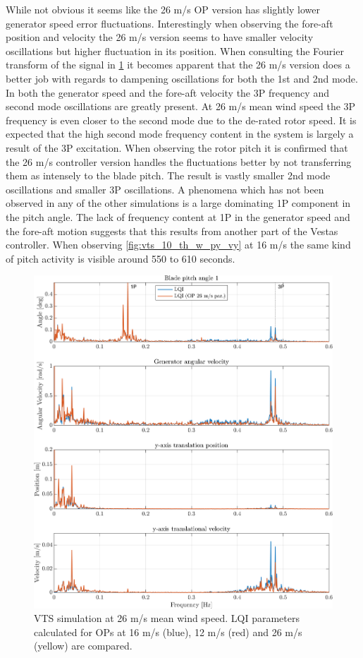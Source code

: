 While not obvious it seems like the 26 m/s OP version has slightly lower generator speed error fluctuations. Interestingly when observing the fore-aft position and velocity the 26 m/s version seems to have smaller velocity oscillations but higher fluctuation in its position. When consulting the Fourier transform of the signal in \cref{fig:vts_31_fft_th_w_py_vy} it becomes apparent that the 26 m/s version does a better job with regards to dampening oscillations for both the 1st and 2nd mode. In both the generator speed and the fore-aft velocity the 3P frequency and second mode oscillations are greatly present. At 26 m/s mean wind speed the 3P frequency is even closer to the second mode due to the de-rated rotor speed. It is expected that the high second mode frequency content in the system is largely a result of the 3P excitation. When observing the rotor pitch it is confirmed that the 26 m/s controller version handles the fluctuations better by not transferring them as intensely to the blade pitch. The result is vastly smaller 2nd mode oscillations and smaller 3P oscillations. A phenomena which has not been observed in any of the other simulations is a large dominating 1P component in the pitch angle. The lack of frequency content at 1P in the generator speed and the fore-aft motion suggests that this results from another part of the Vestas controller. When observing \cref{fig:vts_10_th_w_py_vy} at 16 m/s the same kind of pitch activity is visible around 550 to 610 seconds.
\begin{figure}[h]
	\centering
	\includegraphics[width=0.7\linewidth]{Graphics/TestResults/VTSplotting/31_fft_th_w_py_vy.png}
	\caption{VTS simulation at 26 m/s mean wind speed. LQI parameters calculated for OPs at 16 m/s (blue), 12 m/s (red) and 26 m/s (yellow) are compared.}
	\label{fig:vts_31_fft_th_w_py_vy}
\end{figure}
\newpage
